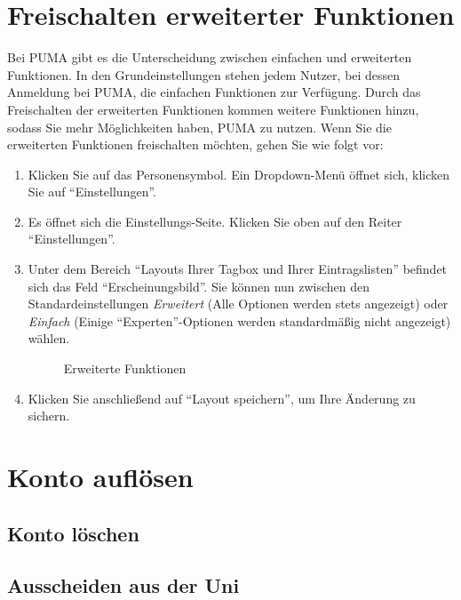 \section{Freischalten erweiterter Funktionen}
\label{sec:freischaltenErweiterterFunktionen}
Bei PUMA gibt es die Unterscheidung zwischen einfachen und erweiterten Funktionen. In den Grundeinstellungen stehen jedem Nutzer, bei dessen Anmeldung bei PUMA, die einfachen Funktionen zur Verfügung. Durch das Freischalten der erweiterten Funktionen kommen weitere Funktionen hinzu, sodass Sie mehr Möglichkeiten haben, PUMA zu nutzen.  Wenn Sie die erweiterten Funktionen freischalten möchten, gehen Sie wie folgt vor:
\begin{enumerate}
    \item Klicken Sie auf das Personensymbol. Ein Dropdown-Menü öffnet sich, klicken Sie auf \enquote{Einstellungen}.
    \item Es öffnet sich die Einstellungs-Seite. Klicken Sie oben auf den Reiter \enquote{Einstellungen}.
    \item Unter dem Bereich \enquote{Layouts Ihrer Tagbox und Ihrer Eintragslisten} befindet sich das Feld \enquote{Erscheinungsbild}. Sie können nun zwischen den Standardeinstellungen \textit{Erweitert} (Alle Optionen werden stets angezeigt) oder \textit{Einfach} (Einige \enquote{Experten}-Optionen werden standardmäßig nicht angezeigt) wählen.
    \begin{figure}[h!]
 \centering
 \caption{Erweiterte Funktionen}
 \label{fig:erweiterteFunktionen}
\end{figure} 
    \item Klicken Sie anschließend auf \enquote{Layout speichern}, um Ihre Änderung zu sichern.
\end{enumerate}
\section{Konto auflösen}
\label{sec:kontoAufloesen} 
\subsection{Konto löschen} \label{subsec:kontoAufloesen}
\subsection{Ausscheiden aus der Uni} \label{subsec:kontoLoeschen}
